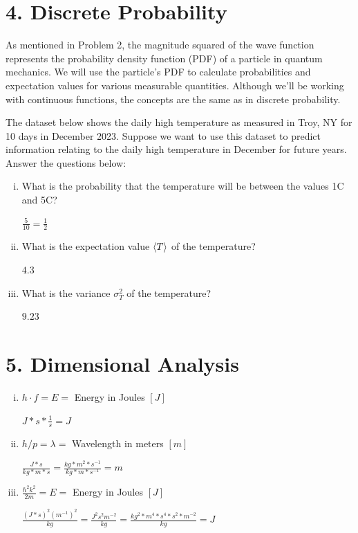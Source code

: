 \documentclass[10pt,letterpaper]{article}
\begin{document}
\section*{4. Discrete Probability}
As mentioned in Problem 2, the magnitude squared of the wave function represents the probability density function (PDF) of a particle in quantum mechanics. We will use the particle’s PDF to calculate probabilities and expectation values for various measurable quantities. Although we’ll be working with continuous functions, the concepts are the same as in discrete probability.

\noindent The dataset below shows the daily high temperature as measured in Troy, NY for 10 days in December 2023. Suppose we want to use this dataset to predict information relating to the daily high temperature in December for future years. Answer the questions below:

\begin{enumerate}[i)]
\item What is the probability that the temperature will be between the values 1C and 5C?

\color{violet}
$\frac{5}{10} = \frac{1}{2}$
\color{black}

\item What is the expectation value $\braket{T}$ of the temperature?

\color{violet}
$4.3$
\color{black}

\item What is the variance $\sigma_{T}^{2}$ of the temperature?

\color{violet}
$9.23$
\color{black}

\end{enumerate}

\section*{5. Dimensional Analysis}

\begin{enumerate}[i)]
\item $h \cdot f = E = $ Energy in Joules $[J]$

\color{violet}
$J * s * \frac{1}{s} = J$
\color{black}

\item $h/p = \lambda = $ Wavelength in meters $[m]$

\color{violet}
$\frac{J * s}{kg * m * s} = \frac{kg * m^{2} * s^{-1}}{kg * m * s^{-1}} = m$
\color{black}

\item $\frac{\hbar^{2}k^{2}}{2m} = E = $ Energy in Joules $[J]$

\color{violet}
$\frac{(J*s)^{2}(m^{-1})^{2}}{kg} = \frac{J^{2}s^{2}m^{-2}}{kg} = \frac{kg^{2} * m^{4} * s^{4} * s^{2} * m^{-2}}{kg} = J$
\color{black}
\end{enumerate}
\end{document}
